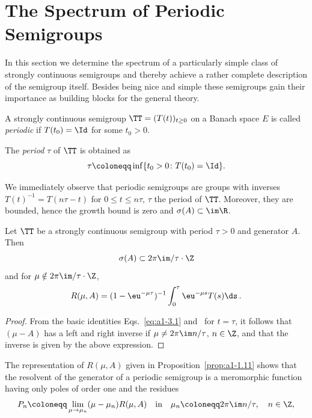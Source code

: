 \section{The Spectrum of Periodic Semigroups} \label{sec:a3-5}
In this section we determine the spectrum of a particularly simple class of strongly continuous semigroups and thereby achieve a rather complete description of the semigroup itself.
Besides being nice and simple these semigroups gain their importance as building blocks for the general theory.
\begin{definition}\label{def:a3-5.1}
A strongly continuous semigroup $\TT = (T(t))_{t \geq 0}$ on a Banach space $E$ is called \emph{periodic} if\/ $T(t_{0}) = \Id$ for some $t_{0} > 0$.

The \emph{period} $\tau$ of\/ $\TT$ is obtained as 
%
\[
	\tau \coloneqq \inf\{t_{0} > 0 \colon T(t_{0}) = \Id\} .
\]
%
\end{definition}
We immediately observe that periodic semigroups are groups with inverses $T(t)^{-1} = T(n\tau-t)$ for $0 \leq t \leq n\tau$, $\tau$ the period of\/ $\TT$.
Moreover, they are bounded, hence the growth bound is zero and $\sigma(A) \subset \im\R$.
\begin{lemma}\label{lem:a3-5.2}
Let $\TT$ be a strongly continuous semigroup with period $\tau > 0$ and generator $A$.
Then
\[
\sigma(A) \subset 2\pi \im/\tau\cdot\Z
\]
and for $\mu \notin 2\pi\im /\tau\cdot\Z$,
\begin{equation}\label{eq:a3-5.1}
R(\mu,A) = (1-\eu^{-\mu\tau})^{-1} \int_{0}^{\tau}\eu^{-\mu s}T(s) \ds\,.
\end{equation}
\end{lemma}
\begin{proof}
From the basic identities Eqs.~\eqref{eq:a1-3.1} and~ for $t = \tau$, it follows that $(\mu - A)$ has a left and right inverse if\/ $\mu \neq 2\pi\im n/\tau$, $n \in \Z$, and that the inverse is given by the above expression.
\end{proof}
The representation of\/ $R(\mu,A)$ given in Proposition~\ref{prop:a1-1.11} shows that the resolvent of the generator of a periodic semigroup is a meromorphic function having only poles of order one and the residues
\[
P_{n} \coloneqq \lim_{\mu \to \mu_{n}} (\mu-\mu_{n})R(\mu,A) \quad \text{in} \quad \mu_{n} \coloneqq 2\pi\im n/\tau, \quad n \in \Z ,
\]
